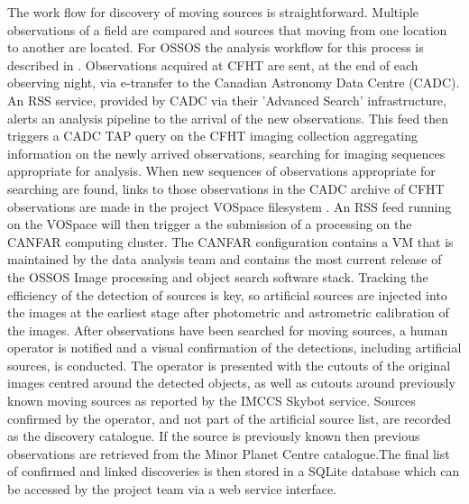 The work flow for discovery of moving sources is straightforward.  Multiple observations of a field are compared and sources that moving from one location to another are located. For OSSOS the analysis workflow for this process is described in \citet{2004MNRAS.347..471P}. Observations acquired at CFHT are sent, at the end of each observing night, via e-transfer to the Canadian Astronomy Data Centre (CADC).  An RSS service, provided by CADC via their 'Advanced Search' infrastructure, alerts an analysis pipeline to the arrival of the new observations. This feed then triggers a CADC TAP query on the CFHT imaging collection aggregating information on the newly arrived observations, searching for imaging sequences appropriate for analysis.  When new sequences of observations appropriate for searching are found, links to those observations in the CADC archive of CFHT observations are made in the project VOSpace filesystem \citep{2012ASPC..461..367K}. An RSS feed running on the VOSpace will then trigger a the submission of a processing on the CANFAR \citep{2009ASPC..411..185G} computing cluster. The CANFAR configuration contains a VM that is maintained by the data analysis team and contains the most current release of the OSSOS Image processing and object search software stack. Tracking the efficiency of the detection of sources is key, so artificial sources are injected into the images at the earliest stage after photometric and astrometric calibration of the images. After observations have been searched for moving sources, a human operator  is notified and a visual confirmation of the detections, including artificial sources, is conducted. The operator is presented with the cutouts of the original images centred around the detected objects, as well as cutouts around previously known moving sources as reported by the IMCCS Skybot \citep{2006ASPC..351..367B} service. Sources  confirmed by the operator, and not part of the artificial source list, are recorded as the discovery catalogue.  If the source is previously known then previous observations are retrieved from the Minor Planet Centre catalogue.The final list of confirmed and linked discoveries is then stored in a SQLite database which can be accessed by the project team via a web service interface. 


